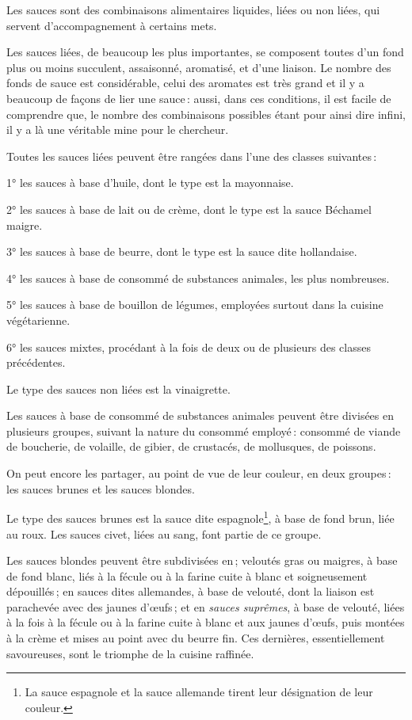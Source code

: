 Les sauces sont des combinaisons alimentaires liquides, liées ou non liées, qui
servent d'accompagnement à certains mets.

Les sauces liées, de beaucoup les plus importantes, se composent toutes d'un
fond plus ou moins succulent, assaisonné, aromatisé, et d’une liaison. Le
nombre des fonds de sauce est considérable, celui des aromates est très grand
et il y a beaucoup de façons de lier une sauce : aussi, dans ces conditions, il
est facile de comprendre que, le nombre des combinaisons possibles étant pour
ainsi dire infini, il y a là une véritable mine pour le chercheur.

Toutes les sauces liées peuvent être rangées dans l’une des classes suivantes :

1° les sauces à base d'huile, dont le type est la mayonnaise.

2° les sauces à base de lait ou de crème, dont le type est la sauce Béchamel
maigre.

3° les sauces à base de beurre, dont le type est la sauce dite hollandaise.

4° les sauces à base de consommé de substances animales, les plus nombreuses.

5° les sauces à base de bouillon de légumes, employées surtout dans la cuisine
végétarienne.

6° les sauces mixtes, procédant à la fois de deux ou de plusieurs des classes
précédentes.

Le type des sauces non liées est la vinaigrette.

Les sauces à base de consommé de substances animales peuvent être divisées en
plusieurs groupes, suivant la nature du consommé employé : consommé de viande
de boucherie, de volaille, de gibier, de crustacés, de mollusques, de poissons.

On peut encore les partager, au point de vue de leur couleur, en deux groupes :
les sauces brunes et les sauces blondes.

Le type des sauces brunes est la sauce dite espagnole\footnote{La sauce
espagnole et la sauce allemande tirent leur désignation de leur couleur.},
à base de fond brun, liée au roux. Les sauces civet, liées au sang, font partie
de ce groupe.

Les sauces blondes peuvent être subdivisées en ; veloutés gras ou maigres,
à base de fond blanc, liés à la fécule ou à la farine cuite à blanc et
soigneusement dépouillés ; en sauces dites allemandes, à base de velouté, dont
la liaison est parachevée avec des jaunes d'œufs ; et en \textit{sauces
suprêmes}, à base de velouté, liées à la fois à la fécule ou à la farine cuite
à blanc et aux jaunes d'œufs, puis montées à la crème et mises au point avec du
beurre fin. Ces dernières, essentiellement savoureuses, sont le triomphe de la
cuisine raffinée.

